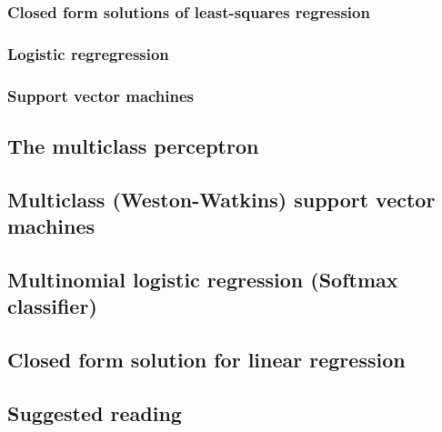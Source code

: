 \subsubsection{Closed form solutions of least-squares regression}

\subsubsection{Logistic regregression}

\subsubsection{Support vector machines}

\subsection{The multiclass perceptron}

\subsection{Multiclass (Weston-Watkins) support vector machines}

\subsection{Multinomial logistic regression (Softmax classifier)}

\subsection{Closed form solution for linear regression}


\subsection{Suggested reading}


